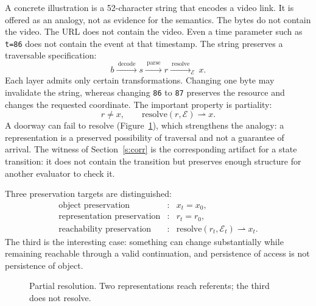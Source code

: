 \documentclass[11pt]{article}
\newcommand{\code}[1]{\texttt{#1}}
\begin{document}
A concrete illustration is a 52-character string that encodes a video link. It is offered as an analogy, not as evidence for the semantics. The bytes do not contain the video. The URL does not contain the video. Even a time parameter such as \code{t=86} does not contain the event at that timestamp. The string preserves a traversable specification:
\[
b\xrightarrow{\ \mathrm{decode}\ }s\xrightarrow{\ \mathrm{parse}\ }r\xrightarrow{\ \mathrm{resolve}\ }_{\mathcal E}\,x.
\]
Each layer admits only certain transformations. Changing one byte may invalidate the string, whereas changing \code{86} to \code{87} preserves the resource and changes the requested coordinate. The important property is partiality:
\[
r\neq x,\qquad \mathrm{resolve}(r,\mathcal E)\rightharpoonup x.
\]
A doorway can fail to resolve (Figure~\ref{f:door}), which strengthens the analogy: a representation is a preserved possibility of traversal and not a guarantee of arrival. The witness of Section~\ref{s:corr} is the corresponding artifact for a state transition: it does not contain the transition but preserves enough structure for another evaluator to check it.

Three preservation targets are distinguished:
\[
\begin{array}{rcl}
\text{object preservation} &:& x_t=x_0,\\
\text{representation preservation} &:& r_t=r_0,\\
\text{reachability preservation} &:& \mathrm{resolve}(r_t,\mathcal E_t)\rightharpoonup x_t.
\end{array}
\]
The third is the interesting case: something can change substantially while remaining reachable through a valid continuation, and persistence of access is not persistence of object.

\begin{figure}[h]
\centering
{}
\caption{Partial resolution. Two representations reach referents; the third does not resolve.}
\label{f:door}
\end{figure}
\end{document}
